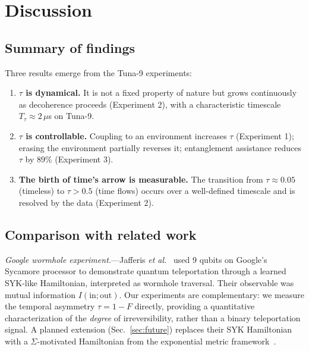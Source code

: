 \documentclass[prl,twocolumn,superscriptaddress,longbibliography,floatfix]{revtex4-2}
\newcommand{\tauasym}{\tau}
\begin{document}
\section{Discussion}
\label{sec:discussion}

\subsection{Summary of findings}

Three results emerge from the Tuna-9 experiments:
\begin{enumerate}
  \item \textbf{$\tauasym$ is dynamical.} It is not a fixed property
    of nature but grows continuously as decoherence proceeds
    (Experiment 2), with a characteristic timescale
    $T_{\tauasym} \approx 2\,\mu$s on Tuna-9.
  \item \textbf{$\tauasym$ is controllable.} Coupling to an
    environment increases $\tauasym$ (Experiment 1); erasing the
    environment partially reverses it; entanglement assistance
    reduces $\tauasym$ by 89\% (Experiment 3).
  \item \textbf{The birth of time's arrow is measurable.} The
    transition from $\tauasym \approx 0.05$ (timeless) to
    $\tauasym > 0.5$ (time flows) occurs over a well-defined
    timescale and is resolved by the data (Experiment 2).
\end{enumerate}

\subsection{Comparison with related work}

\textit{Google wormhole experiment.}---Jafferis
\textit{et al.}~\cite{Jafferis2022} used 9 qubits on Google's
Sycamore processor to demonstrate quantum teleportation through a
learned SYK-like Hamiltonian, interpreted as wormhole traversal.
Their observable was mutual information $I(\text{in};\text{out})$.
Our experiments are complementary: we measure the temporal asymmetry
$\tauasym = 1 - F$ directly, providing a quantitative
characterization of the \emph{degree} of irreversibility, rather
than a binary teleportation signal.  A planned extension
(Sec.~\ref{sec:future}) replaces their SYK Hamiltonian with a
$\Sigma$-motivated Hamiltonian from the exponential metric
framework~\cite{Huang2026b}.
\end{document}
